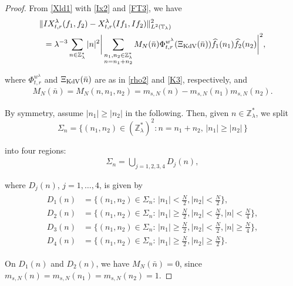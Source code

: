 \documentclass[letterpaper, 11pt,  reqno]{amsart}
\newcommand{\1}{\hspace{0.5mm}\text{I}\hspace{0.5mm}}
\newcommand{\noi}{\noindent}
\newcommand{\Z}{\mathbb{Z}}
\newcommand{\T}{\mathbb{T}}
\newcommand{\ld}{\lambda}
\newcommand{\Si}{\Sigma}
\newcommand{\ft}{\widehat}
\newcommand{\KDV}{\text{\rm KdV} }
\numberwithin{equation}{section}
\numberwithin{theorem}{section}
\begin{document}
\begin{proof}

From \eqref{Xld1} with \eqref{Ix2} and \eqref{FT3}, we have 
\begin{align}
\begin{aligned}
\|  & I X^{\ld}_{t,r}( f _1, f _2) - X^{\ld}_{t,r} (I  f_1, I  f_2) \|^2_{L^2(\T_\ld)}\\
&=
\ld^{-3} \sum_{ n\in\Z_{\ld}^*}
|n|^2 \bigg| \sum_{\substack{n_1, n_2 \in\Z_{\ld}^*\\n = n_1+n_2}}
M_N(\bar n)
\Phi^{w^\ld}_{t,r}(\Xi_\KDV(\bar n))
\ft  f _1(n_1) \ft  f _2 (n_2)
\bigg|^2 ,
\end{aligned}
\label{I6}
\end{align}

\noi
where $\Phi^{w^\ld}_{t, r}$ and 
$\Xi_\KDV(\bar n)$
are as in \eqref{rho2} 
 and \eqref{K3}, respectively, 
 and 
\begin{align}
M_N(\bar n)=  M_N(n,n_1, n_2)=  m_{s, N} (n) - m_{s, N} (n_1) m_{s, N}(n_2) .
\label{I6a}
\end{align}




\noi
By symmetry, assume $|n_1|\ge |n_2|$
in the following.
Then, given $n \in \Z_\ld^*$, 
we split  %
\[\Si_n = \big\{ (n_1, n_2)\in (\Z_\ld^*)^2:
n = n_1+n_2,\, |n_1| \ge |n_2|\, \big\}
\]

\noi
 into four regions: 
\begin{align*}
\Si_n 
= \bigcup_{j=1,2,3,4} D_j(n), 
\end{align*}




\noi
where $D_j(n)$,  $j=1,\dots,4$,  is given by 
\begin{align}
\begin{aligned}
D_1(n)&=\Big\{ (n_1, n_2)\in \Si_n :\, |n_1| <  \frac N2, |n_2| <  \frac N2 \Big\}, \\
D_2(n)&=\Big\{(n_1, n_2)\in \Si_n:\, |n_1| \geq \frac N2, |n_2| <  \frac N2, |n|<  \frac N4 \Big\}, \\
D_3(n)&=\Big\{(n_1, n_2)\in \Si_n:\, |n_1| \geq \frac N2, |n_2| <  \frac N2, |n|\geq \frac N4 \Big\}, \\
D_4(n)&=\Big\{(n_1, n_2)\in \Si_n:\, |n_1| \geq \frac N2, |n_2| \geq \frac N2 \Big\}. 
\label{I8}
\end{aligned}
\end{align}


\noi
On $D_1(n)$ and $D_2(n)$, we have $M_N(\bar n) = 0$, 
since
$m_{s, N}(n)=m_{s, N}(n_1)=m_{s, N}(n_2)=1$. 


\end{proof}
\end{document}
